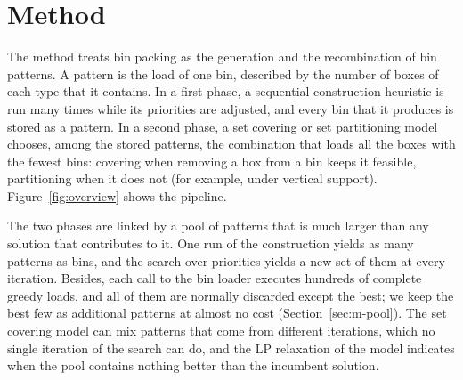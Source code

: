 \providecommand{\cfgfast}{\textsc{Fast}}
\providecommand{\cfgbal}{\textsc{Balanced}}
\providecommand{\cfgqual}{\textsc{Quality}}
\section{Method}
\label{sec:method}

The method treats bin packing as the generation and the recombination of bin patterns. A
pattern is the load of one bin, described by the number of boxes of each type that it contains.
In a first phase, a sequential construction heuristic is run many times while its priorities
are adjusted, and every bin that it produces is stored as a pattern. In a second phase, a set
covering or set partitioning model chooses, among the stored patterns, the combination that
loads all the boxes with the fewest bins: covering when removing a box from a bin keeps it
feasible, partitioning when it does not (for example, under vertical support). Figure~\ref{fig:overview} shows the pipeline.

The two phases are linked by a pool of patterns that is much larger than any solution that
contributes to it. One run of the construction yields as many patterns as bins, and the search
over priorities yields a new set of them at every iteration. Besides, each call to the bin
loader executes hundreds of complete greedy loads, and all of them are normally discarded except
the best; we keep the best few as additional patterns at almost no cost (Section~\ref{sec:m-pool}).
The set covering model can mix patterns that come from different iterations, which no single
iteration of the search can do, and the LP relaxation of the model indicates when the pool
contains nothing better than the incumbent solution.

